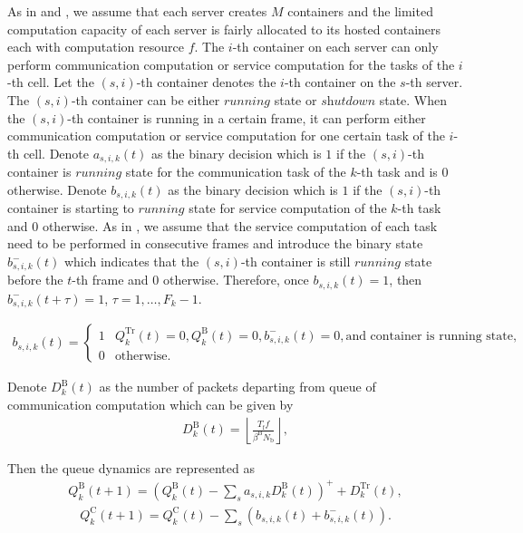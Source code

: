\documentclass[journal, 12pt, onecolumn, draftclsnofoot]{IEEEtran}
\newcommand{\needref}[1]{\text{[#1]}}
\begin{document}
As in \needref{6582405} and \needref{8353131}, we assume that each server creates $M$ containers and the limited computation capacity of each server is fairly allocated to its hosted containers each with computation resource $f$. The $i$-th container on each server can only perform communication computation or service computation for the tasks of the $i$-th cell. Let the $(s,i)$-th container denotes the $i$-th container on the $s$-th server. The $(s,i)$-th container can be either $\textit{running}$ state or $\textit{shutdown}$ state. When the $(s,i)$-th container is running in a certain frame, it can perform either communication computation or service computation for one certain task of the $i$-th cell. Denote $a_{s,i,k}(t)$ as the binary decision which is $1$ if the $(s,i)$-th container is $\textit{running}$ state for the communication task of the $k$-th task and is $0$ otherwise. Denote $b_{s,i,k}(t)$ as the binary decision which is $1$ if the $(s,i)$-th container is starting to $\textit{running}$ state for service computation of the $k$-th task and $0$ otherwise. As in \cite{}, we assume that the service computation of each task need to be performed in consecutive frames and introduce the binary state $b_{s,i,k}^{-}(t)$ which indicates that the $(s,i)$-th container is still $\textit{running}$ state before the $t$-th frame and $0$ otherwise. Therefore, once $b_{s,i,k}(t)=1$, then $b_{s,i,k}^{-}(t+\tau)=1$, $\tau=1,\ldots,F_{k}-1$.

\begin{align}
	b_{s,i,k}(t)=
	\begin{cases}
		1 &Q_{k}^{\mathrm{Tr}}(t)=0,Q_{k}^{\mathrm{B}}(t)=0,b_{s,i,k}^{-}(t)=0,\text{and container is running state,}\\
		0 &\text{otherwise}.
	\end{cases}
\end{align}

Denote $D_{k}^{\mathrm{B}}(t)$ as the number of packets departing from queue of communication computation which can be given by
\begin{align}
	D_{k}^{\mathrm{B}}(t)=\left\lfloor\frac{T_{\mathrm{f}}f}{\beta^{\mathrm{B}}N_{\mathrm{b}}}\right\rfloor,
\end{align}

Then the queue dynamics are represented as
\begin{align}
	Q_{k}^{\mathrm{B}}(t+1)=(Q_{k}^{\mathrm{B}}(t)-\sum_{s}a_{s,i,k}D_{k}^{\mathrm{B}}(t))^{+}+D_{k}^{\mathrm{Tr}}(t),
\end{align}
\begin{align}
	Q_{k}^{\mathrm{C}}(t+1)=Q_{k}^{\mathrm{C}}(t)-\sum_{s}(b_{s,i,k}(t)+b_{s,i,k}^{-}(t)).
\end{align}
\end{document}

